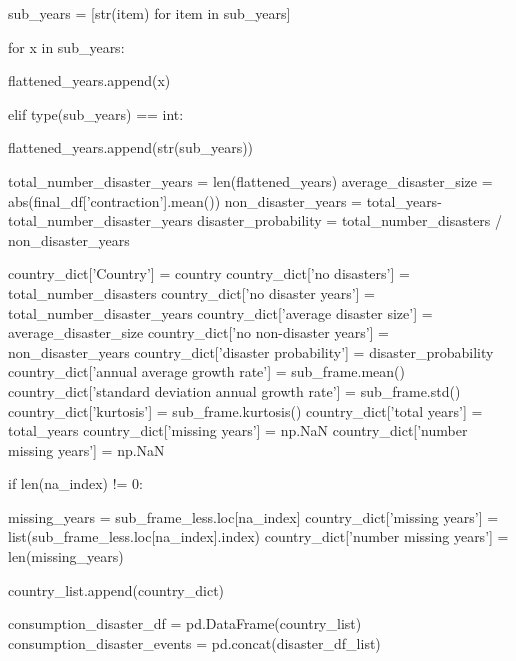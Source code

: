 {{{{\begin{python}
            sub_years = [str(item) for item in sub_years]
        
            for x in sub_years:
            
                flattened_years.append(x)
        
        elif type(sub_years) == int:
        
            flattened_years.append(str(sub_years))
            
    total_number_disaster_years = len(flattened_years)
    average_disaster_size = abs(final_df['contraction'].mean())
    non_disaster_years = total_years-total_number_disaster_years
    disaster_probability = total_number_disasters / non_disaster_years
    
    country_dict['Country'] = country
    country_dict['no disasters'] = total_number_disasters
    country_dict['no disaster years'] = total_number_disaster_years
    country_dict['average disaster size'] = average_disaster_size
    country_dict['no non-disaster years'] = non_disaster_years
    country_dict['disaster probability'] = disaster_probability
    country_dict['annual average growth rate'] = sub_frame.mean()
    country_dict['standard deviation annual growth rate'] = sub_frame.std()
    country_dict['kurtosis'] = sub_frame.kurtosis()
    country_dict['total years'] = total_years
    country_dict['missing years'] = np.NaN
    country_dict['number missing years'] = np.NaN
    
    if len(na_index) != 0:
        
        missing_years = sub_frame_less.loc[na_index]
        country_dict['missing years'] = list(sub_frame_less.loc[na_index].index)
        country_dict['number missing years'] = len(missing_years)
  
    country_list.append(country_dict)
    
consumption_disaster_df = pd.DataFrame(country_list)
consumption_disaster_events = pd.concat(disaster_df_list)
\end{python}
\begin{lstlisting}[frame=none,caption={Peak-to-trough algorithm},captionpos=b,label=lst:code]
\end{lstlisting}



}}}}

